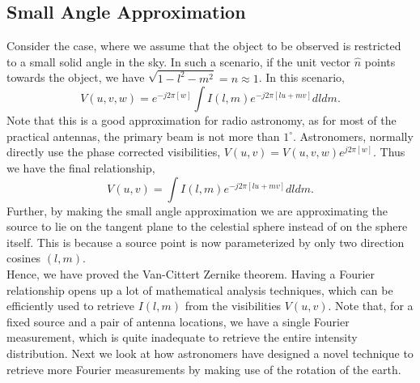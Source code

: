 \subsection*{Small Angle Approximation}

Consider the case, where we assume that the
object to be observed is restricted to a small solid angle in the sky. In such a scenario, if the unit vector $\hat{n}$ points towards the object,
we have $ \sqrt{1-l^2-m^2} = n \approx 1$. In this scenario,
\begin{equation}
 {V}(u,v,w)  = {e^{- j{2\pi} [w]}} \int {I}(l,m) {e^{- j{2\pi} [lu + mv ]}} {dl dm}. 
\end{equation}
Note that this is a good approximation for radio astronomy, as for most of the practical antennas, the primary beam is not more than $1 ^{\circ}$. 
Astronomers, normally directly use the phase corrected visibilities, $ V(u,v) = {V}(u,v,w) {e^{ {j2\pi} [w]}} $.
Thus we have the final relationship, 
\begin{equation}
 V(u,v)  = \int {I}(l,m) {e^{- j{2\pi} [lu + mv ]}} {dl dm}.
 \label{eq:Fourier}
\end{equation}
Further, by making the small angle approximation we are approximating the source to lie on the tangent plane to the celestial sphere instead of on the sphere itself. This is because a source point is now parameterized by only two direction cosines $(l,m)$.\\
Hence, we have proved the Van-Cittert Zernike theorem. Having a Fourier relationship opens up a lot of mathematical analysis techniques,
which can be efficiently used to retrieve ${I}(l,m)$ from the visibilities $V(u,v)$. 
Note that, for a fixed source and a pair of antenna locations, we have a single Fourier measurement, which is quite inadequate to retrieve the entire intensity distribution.
Next we look at how astronomers have designed a novel technique to retrieve more Fourier measurements by making use of the rotation of the earth.


